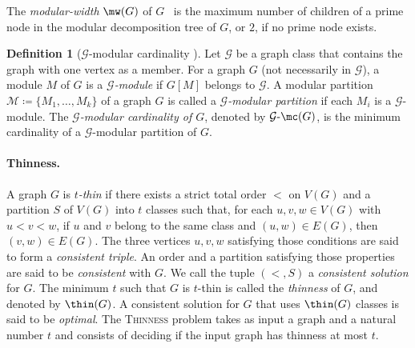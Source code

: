 \documentclass[11pt]{article}
\theoremstyle{plain}
\theoremstyle{definition}
\newtheorem{definition}[theorem]{Definition}
\theoremstyle{remark}
\newcommand{\G}{\mathcal{G}}
\newcommand{\Gmc}{\text{$\G$-$\mc$}}
\begin{document}
The \emph{modular-width} $\mw(G)$ of $G$~\citep{modular-width} is the maximum number of children of a prime node in the modular decomposition tree of $G$, or $2$, if no prime node exists. 

\begin{definition}[$\mathcal{G}$-modular cardinality {\citep[Definition 1]{modular-partitions-MFCS23}}]

Let $\mathcal{G}$ be a graph class that contains the graph with one vertex as a member. For a graph $G$ (not necessarily in $\mathcal{G}$), a module $M$ of
$G$ is a \emph{$\mathcal{G}$-module} if $G[M]$ belongs to $\mathcal{G}$. A modular partition $\mathcal{M} \coloneqq \{M_1, \dots , M_k\}$ of a graph
$G$ is called a \emph{$\mathcal{G}$-modular partition} if each $M_i$ is a $\mathcal{G}$-module. The \emph{$\mathcal{G}$-modular cardinality of
$G$}, denoted by $\Gmc(G)$, is the minimum cardinality of a $\mathcal{G}$-modular partition of $G$.
\end{definition}


\paragraph{Thinness.} A graph $G$ is \emph{$t$-thin} if there exists a strict total order $<$ on $V(G)$ and a partition $S$ of $V(G)$ into
$t$ classes such that, for each $u, v, w \in V(G)$ with $u < v <
w$, if $u$ and $v$ belong to the same class and $(u,w) \in
E(G)$, then $(v,w) \in E(G)$. The three vertices $u, v, w$ satisfying those conditions are said to form a \emph{consistent triple}. An order and a partition
satisfying those properties are said to be \textit{consistent} with $G$. We
call the tuple $(<, S)$ a \emph{consistent solution} for $G$. The minimum $t$ such that $G$ is
$t$-thin is called the \textit{thinness} of $G$, and denoted by
$\thin(G)$. A consistent solution for $G$ that uses $\thin(G)$ classes is said to be \emph{optimal}. The \textsc{Thinness} problem takes as input a graph and a natural number $t$ and consists of deciding if the input graph has thinness at most $t$.
\end{document}
